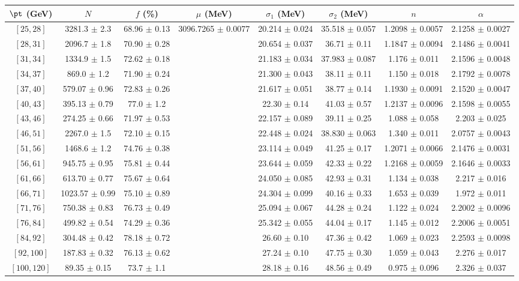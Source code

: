 \begin{tabular}{c||c|c|c|c|c|c|c}
$\pt$ (GeV) & $N$ & $f$ (\%) & $\mu$ (MeV) & $\sigma_1$ (MeV) & $\sigma_2$ (MeV) & $n$ & $\alpha$ \\
\hline
$[25, 28]$ & 3281.3 $\pm$ 2.3 & 68.96 $\pm$ 0.13 & \multirow{17}{*}{3096.7265 $\pm$ 0.0077} & 20.214 $\pm$ 0.024 & 35.518 $\pm$ 0.057 & 1.2098 $\pm$ 0.0057 & 2.1258 $\pm$ 0.0027\\
$[28, 31]$ & 2096.7 $\pm$ 1.8 & 70.90 $\pm$ 0.28 &  & 20.654 $\pm$ 0.037 & 36.71 $\pm$ 0.11 & 1.1847 $\pm$ 0.0094 & 2.1486 $\pm$ 0.0041\\
$[31, 34]$ & 1334.9 $\pm$ 1.5 & 72.62 $\pm$ 0.18 &  & 21.183 $\pm$ 0.034 & 37.983 $\pm$ 0.087 & 1.176 $\pm$ 0.011 & 2.1596 $\pm$ 0.0048\\
$[34, 37]$ & 869.0 $\pm$ 1.2 & 71.90 $\pm$ 0.24 &  & 21.300 $\pm$ 0.043 & 38.11 $\pm$ 0.11 & 1.150 $\pm$ 0.018 & 2.1792 $\pm$ 0.0078\\
$[37, 40]$ & 579.07 $\pm$ 0.96 & 72.83 $\pm$ 0.26 &  & 21.617 $\pm$ 0.051 & 38.77 $\pm$ 0.14 & 1.1930 $\pm$ 0.0091 & 2.1520 $\pm$ 0.0047\\
$[40, 43]$ & 395.13 $\pm$ 0.79 & 77.0 $\pm$ 1.2 &  & 22.30 $\pm$ 0.14 & 41.03 $\pm$ 0.57 & 1.2137 $\pm$ 0.0096 & 2.1598 $\pm$ 0.0055\\
$[43, 46]$ & 274.25 $\pm$ 0.66 & 71.97 $\pm$ 0.53 &  & 22.157 $\pm$ 0.089 & 39.11 $\pm$ 0.25 & 1.088 $\pm$ 0.058 & 2.203 $\pm$ 0.025\\
$[46, 51]$ & 2267.0 $\pm$ 1.5 & 72.10 $\pm$ 0.15 &  & 22.448 $\pm$ 0.024 & 38.830 $\pm$ 0.063 & 1.340 $\pm$ 0.011 & 2.0757 $\pm$ 0.0043\\
$[51, 56]$ & 1468.6 $\pm$ 1.2 & 74.76 $\pm$ 0.38 &  & 23.114 $\pm$ 0.049 & 41.25 $\pm$ 0.17 & 1.2071 $\pm$ 0.0066 & 2.1476 $\pm$ 0.0031\\
$[56, 61]$ & 945.75 $\pm$ 0.95 & 75.81 $\pm$ 0.44 &  & 23.644 $\pm$ 0.059 & 42.33 $\pm$ 0.22 & 1.2168 $\pm$ 0.0059 & 2.1646 $\pm$ 0.0033\\
$[61, 66]$ & 613.70 $\pm$ 0.77 & 75.67 $\pm$ 0.64 &  & 24.050 $\pm$ 0.085 & 42.93 $\pm$ 0.31 & 1.134 $\pm$ 0.038 & 2.217 $\pm$ 0.016\\
$[66, 71]$ & 1023.57 $\pm$ 0.99 & 75.10 $\pm$ 0.89 &  & 24.304 $\pm$ 0.099 & 40.16 $\pm$ 0.33 & 1.653 $\pm$ 0.039 & 1.972 $\pm$ 0.011\\
$[71, 76]$ & 750.38 $\pm$ 0.83 & 76.73 $\pm$ 0.49 &  & 25.094 $\pm$ 0.067 & 44.28 $\pm$ 0.24 & 1.122 $\pm$ 0.024 & 2.2002 $\pm$ 0.0096\\
$[76, 84]$ & 499.82 $\pm$ 0.54 & 74.29 $\pm$ 0.36 &  & 25.342 $\pm$ 0.055 & 44.04 $\pm$ 0.17 & 1.145 $\pm$ 0.012 & 2.2006 $\pm$ 0.0051\\
$[84, 92]$ & 304.48 $\pm$ 0.42 & 78.18 $\pm$ 0.72 &  & 26.60 $\pm$ 0.10 & 47.36 $\pm$ 0.42 & 1.069 $\pm$ 0.023 & 2.2593 $\pm$ 0.0098\\
$[92, 100]$ & 187.83 $\pm$ 0.32 & 76.13 $\pm$ 0.62 &  & 27.24 $\pm$ 0.10 & 47.75 $\pm$ 0.30 & 1.059 $\pm$ 0.043 & 2.276 $\pm$ 0.017\\
$[100, 120]$ & 89.35 $\pm$ 0.15 & 73.7 $\pm$ 1.1 &  & 28.18 $\pm$ 0.16 & 48.56 $\pm$ 0.49 & 0.975 $\pm$ 0.096 & 2.326 $\pm$ 0.037\\
\end{tabular}
